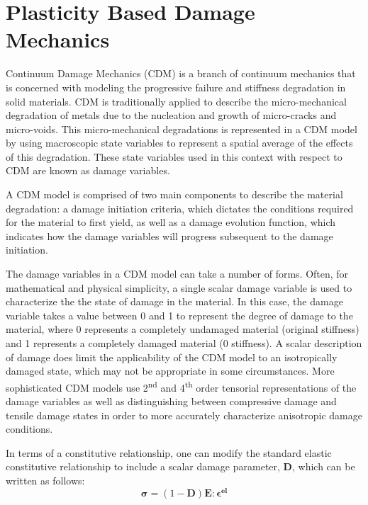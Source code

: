 \section{Plasticity Based Damage Mechanics}

Continuum Damage Mechanics (CDM) is a branch of continuum mechanics that is concerned with modeling the progressive failure and stiffness degradation in solid materials. CDM is traditionally applied to describe the micro-mechanical degradation of metals due to the nucleation and growth of micro-cracks and micro-voids. This micro-mechanical degradations is represented in a CDM model by using macroscopic state variables to represent a spatial average of the effects of this degradation. These state variables used in this context with respect to CDM are known as damage variables. 

A CDM model is comprised of two main components to describe the material degradation: a damage initiation criteria, which dictates the conditions required for the material to first yield, as well as a damage evolution function, which indicates how the damage variables will progress subsequent to the damage initiation. 

The damage variables in a CDM model can take a number of forms. Often, for mathematical and physical simplicity, a single scalar damage variable is used to characterize the the state of damage in the material. In this case, the damage variable takes a value between 0 and 1 to represent the degree of damage to the material, where 0 represents a completely undamaged material (original stiffness) and 1 represents a completely damaged material (0 stiffness). A scalar description of damage does limit the applicability of the CDM model to an isotropically damaged state, which may not be appropriate in some circumstances. More sophisticated CDM models use 2\textsuperscript{nd} and 4\textsuperscript{th} order tensorial representations of the damage variables as well as distinguishing between compressive damage and tensile damage states in order to more accurately characterize anisotropic damage conditions. 

In terms of a constitutive relationship, one can modify the standard elastic constitutive relationship to include a scalar damage
parameter, $\mathbf{D}$, which can be written as follows: 
\begin{equation}
\boldsymbol{\sigma}=(1-\mathbf{D})\mathbf{E}:\boldsymbol{\epsilon^{el}}\label{eqn:const3}
\end{equation}

